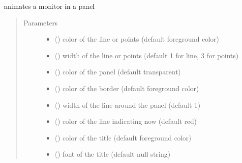 \documentclass[letterpaper,10pt,english]{sphinxmanual}
\begin{document}
\begin{fulllineitems}
\label{\detokenize{Reference:salabim.AnimateMonitor}}
animates a monitor in a panel
\begin{quote}\begin{description}
\item[{Parameters}] \leavevmode\begin{itemize}
\item {} 
 () \textendash{} color of the line or points (default foreground color)

\item {} 
 () \textendash{} width of the line or points (default 1 for line, 3 for points)

\item {} 
 () \textendash{} color of the panel (default transparent)

\item {} 
 () \textendash{} color of the border (default foreground color)

\item {} 
 () \textendash{} width of the line around the panel (default 1)

\item {} 
 () \textendash{} color of the line indicating now (default red)

\item {} 
 () \textendash{} color of the title (default foreground color)

\item {} 
 ({\hyperref[\detokenize{Reference:salabim.Animate.font}]{}}) \textendash{} font of the title (default null string)


\end{itemize}
\end{description}
\end{quote}
\end{fulllineitems}
\end{document}
